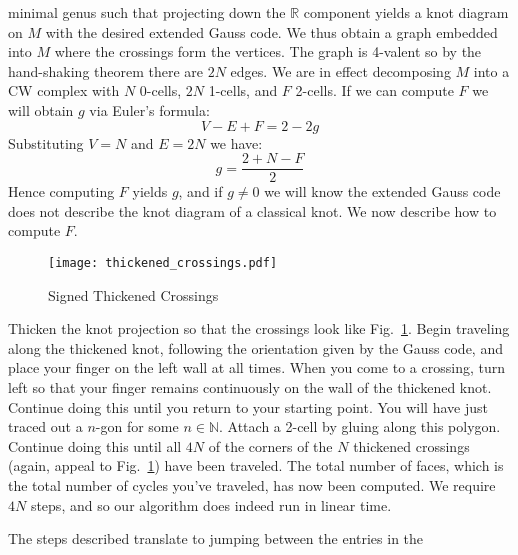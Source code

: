         minimal genus such that projecting down the $\mathbb{R}$ component
        yields a knot diagram on $M$ with the desired extended Gauss code.
        We thus obtain a graph embedded into $M$ where the crossings form the
        vertices. The graph is 4-valent so by the hand-shaking theorem there
        are $2N$ edges. We are in effect decomposing $M$ into a CW complex with
        $N$ 0-cells, $2N$ 1-cells, and $F$ 2-cells. If we can compute $F$ we
        will obtain $g$ via Euler's formula:
        \begin{equation}
            V-E+F=2-2g
        \end{equation}
        Substituting $V=N$ and $E=2N$ we have:
        \begin{equation}
            g=\frac{2+N-F}{2}
        \end{equation}
        Hence computing $F$ yields $g$, and if $g\ne{0}$ we will know the
        extended Gauss code does not describe the knot diagram of a
        classical knot. We now describe how to compute $F$.
        \par\hfill\par
        \begin{figure}
            \centering
            \texttt{[image: thickened\_crossings.pdf]}
            \caption{Signed Thickened Crossings}
            \label{fig:thickened_crossings_chapt1}
        \end{figure}
        Thicken the knot projection so that the crossings look like
        Fig.~\ref{fig:thickened_crossings_chapt1}.
        Begin traveling along the thickened
        knot, following the orientation given by the Gauss code, and place your
        finger on the left wall at all times. When you come to a crossing,
        turn left so that your finger remains continuously on the wall of the
        thickened knot. Continue doing this until you return to your starting
        point. You will have just traced out a $n$-gon for some
        $n\in\mathbb{N}$. Attach a 2-cell by gluing along this polygon.
        Continue doing this until all $4N$ of the corners of the $N$ thickened
        crossings (again, appeal to
        Fig.~\ref{fig:thickened_crossings_chapt1}) have
        been traveled. The total number of faces, which is the total number of
        cycles you've traveled, has now been computed. We require $4N$ steps,
        and so our algorithm does indeed run in linear time.
        \par\hfill\par
        The steps described translate to jumping between the entries in the
